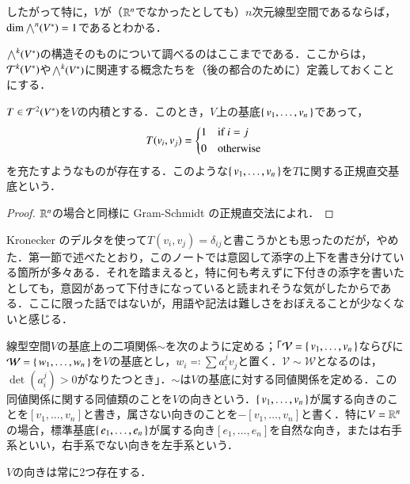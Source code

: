 したがって特に，$V$が（$\mathbb{R}^n$でなかったとしても）$n$次元線型空間であるならば，$\dim \bigwedge^n(V^*)=1$であるとわかる．

$\bigwedge^k(V^*)$の構造そのものについて調べるのはここまでである．ここからは，$\mathcal{T}^k(V^*)$や$\bigwedge^k(V^*)$に関連する概念たちを（後の都合のために）定義しておくことにする．

\begin{lem}
$T \in \mathcal{T}^2(V^*)$を$V$の内積とする．このとき，$V$上の基底$\set{v_1, \dots, v_n}$であって，
\begin{equation}
T(v_i, v_j) = \begin{dcases*}
    1 & if $i=j$ \\
    0 & otherwise
  \end{dcases*}
\end{equation}
を充たすようなものが存在する．このような$\set{v_1, \dots, v_n}$を$T$に関する正規直交基底という．
\end{lem}

\begin{proof}
$\mathbb{R}^n$の場合と同様に Gram-Schmidt の正規直交法によれ．
\end{proof}

\begin{dig}
Kronecker のデルタを使って$T(v_i, v_j) = \delta_{ij}$と書こうかとも思ったのだが，やめた．第一節で述べたとおり，このノートでは意図して添字の上下を書き分けている箇所が多々ある．それを踏まえると，特に何も考えずに下付きの添字を書いたとしても，意図があって下付きになっていると読まれそうな気がしたからである．ここに限った話ではないが，用語や記法は難しさをおぼえることが少なくないと感じる．
\end{dig}

\begin{defi}
線型空間$V$の基底上の二項関係$\sim$を次のように定める；「$\mathcal{V} = \set{v_1, \dots, v_n}$ならびに$\mathcal{W} = \set{w_1, \dots, w_n}$を$V$の基底とし，$w_i \eqqcolon \sum a_i^j v_j$と置く．$\mathcal{V} \sim \mathcal{W}$となるのは，$\det \left(a_i^j\right) > 0$がなりたつとき」．$\sim$は$V$の基底に対する同値関係を定める．この同値関係に関する同値類のことを$V$の向きという．$\set{v_1, \dots, v_n}$が属する向きのことを$[ v_1, \dots, v_n ]$と書き，属さない向きのことを$- [ v_1, \dots, v_n ]$と書く．特に$V=\mathbb{R}^n$の場合，標準基底$\set{e_1, \dots, e_n}$が属する向き$[e_1, \dots, e_n]$を自然な向き，または右手系といい，右手系でない向きを左手系という．
\end{defi}

\begin{que}
$V$の向きは常に2つ存在する．
\end{que}

